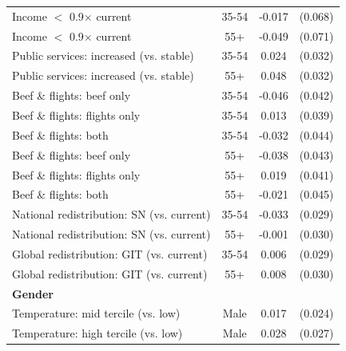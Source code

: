 \begin{table}[H]
\begin{tabular}{ l c c c }
\hspace{0.05cm} Income $<$ 0.9$\times$ current & 35-54 & -0.017 & (0.068) \\
\hspace{0.05cm} Income $<$ 0.9$\times$ current & 55+ & -0.049 & (0.071) \\
\hspace{0.05cm} Public services: increased (vs. stable) & 35-54 & 0.024 & (0.032) \\
\hspace{0.05cm} Public services: increased (vs. stable) & 55+ & 0.048 & (0.032) \\
\hspace{0.05cm} Beef \& flights: beef only & 35-54 & -0.046 & (0.042) \\
\hspace{0.05cm} Beef \& flights: flights only & 35-54 & 0.013 & (0.039) \\
\hspace{0.05cm} Beef \& flights: both & 35-54 & -0.032 & (0.044) \\
\hspace{0.05cm} Beef \& flights: beef only & 55+ & -0.038 & (0.043) \\
\hspace{0.05cm} Beef \& flights: flights only & 55+ & 0.019 & (0.041) \\
\hspace{0.05cm} Beef \& flights: both & 55+ & -0.021 & (0.045) \\
\hspace{0.05cm} National redistribution: SN (vs. current) & 35-54 & -0.033 & (0.029) \\
\hspace{0.05cm} National redistribution: SN (vs. current) & 55+ & -0.001 & (0.030) \\
\hspace{0.05cm} Global redistribution: GIT (vs. current) & 35-54 & 0.006 & (0.029) \\
\hspace{0.05cm} Global redistribution: GIT (vs. current) & 55+ & 0.008 & (0.030) \\
\hline
\multicolumn{4}{l}{\textbf{Gender}} \\
\hspace{0.05cm} Temperature: mid tercile (vs. low) & Male & 0.017 & (0.024) \\
\hspace{0.05cm} Temperature: high tercile (vs. low) & Male & 0.028 & (0.027) \\

\end{tabular}
\end{table}
